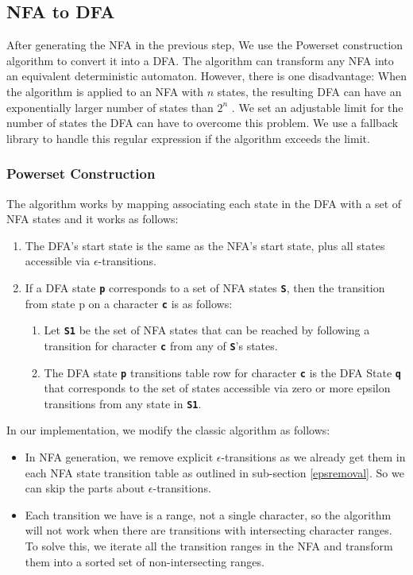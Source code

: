 \subsection{NFA to DFA}\label{subsection:nfdtodfa}
After generating the NFA in the previous step, We use the Powerset construction algorithm to convert it into a DFA. The algorithm can transform any NFA into an equivalent deterministic automaton. However, there is one disadvantage: When the algorithm is applied to an NFA with $n$ states, the resulting DFA can have an exponentially larger number of states than $2^n$ \cite{dfasize}. We set an adjustable limit for the number of states the DFA can have to overcome this problem. We use a fallback library to handle this regular expression if the algorithm exceeds the limit.

\subsubsection{Powerset Construction}
The algorithm works by mapping associating each state in the DFA with a set of NFA states and it works as follows:
\begin{enumerate}
    \item The DFA's start state is the same as the NFA's start state, plus all states accessible via $\epsilon$-transitions.
    \item If a DFA state \texttt{\textbf{p}} corresponds to a set of NFA states \texttt{\textbf{S}}, then the transition from state p on a character \texttt{\textbf{c}} is as follows:
    \begin{enumerate}
        \item Let \texttt{\textbf{S1}} be the set of NFA states that can be reached by following a transition for character \texttt{\textbf{c}} from any of \texttt{\textbf{S}}'s states.
        \item The DFA state \texttt{\textbf{p}} transitions table row for character \texttt{\textbf{c}} is the DFA State \texttt{\textbf{q}} that corresponds to the set of states accessible via zero or more epsilon transitions from any state in \texttt{\textbf{S1}}.
    \end{enumerate}
\end{enumerate}
 

In our implementation, we modify the classic algorithm as follows:
 \begin{itemize}
     \item In NFA generation, we remove explicit $\epsilon$-transitions as we already get them in each NFA state transition table as outlined in sub-section \ref{epsremoval}. So we can skip the parts about $\epsilon$-transitions.
     \item Each transition we have is a range, not a single character, so the algorithm will not work when there are transitions with intersecting character ranges. To solve this, we iterate all the transition ranges in the NFA and transform them into a sorted set of non-intersecting ranges.
 \end{itemize}
 
